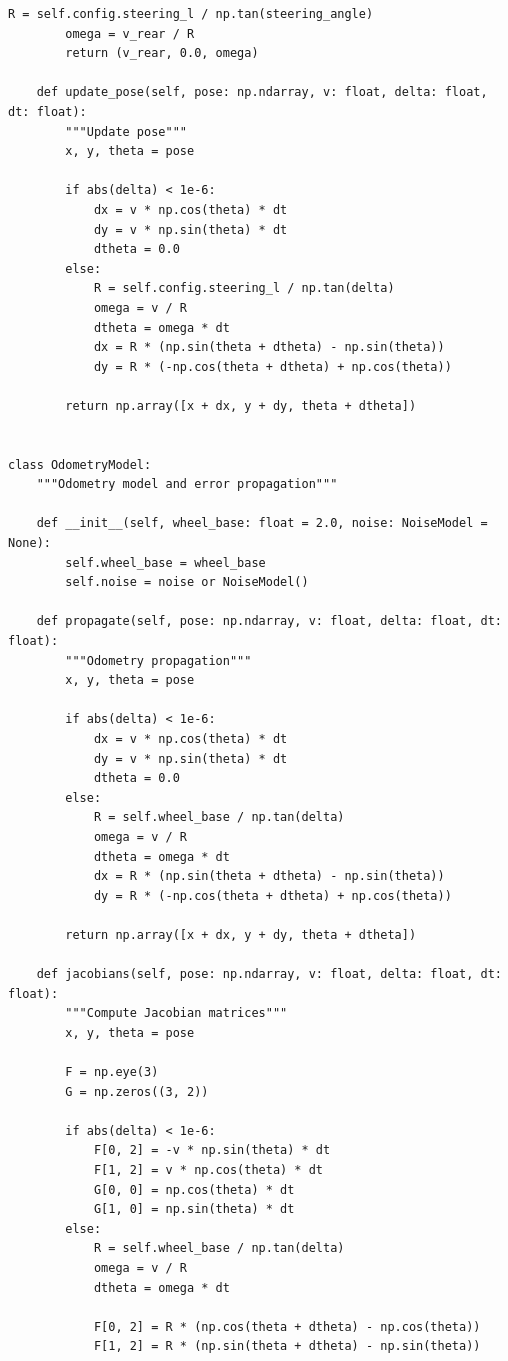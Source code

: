 \documentclass[12pt,a4paper]{report}
\begin{document}
\begin{lstlisting}[caption={Complete Simulation System (complete\_simulation.py)}]
        R = self.config.steering_l / np.tan(steering_angle)
        omega = v_rear / R
        return (v_rear, 0.0, omega)
    
    def update_pose(self, pose: np.ndarray, v: float, delta: float, dt: float):
        """Update pose"""
        x, y, theta = pose
        
        if abs(delta) < 1e-6:
            dx = v * np.cos(theta) * dt
            dy = v * np.sin(theta) * dt
            dtheta = 0.0
        else:
            R = self.config.steering_l / np.tan(delta)
            omega = v / R
            dtheta = omega * dt
            dx = R * (np.sin(theta + dtheta) - np.sin(theta))
            dy = R * (-np.cos(theta + dtheta) + np.cos(theta))
        
        return np.array([x + dx, y + dy, theta + dtheta])


class OdometryModel:
    """Odometry model and error propagation"""
    
    def __init__(self, wheel_base: float = 2.0, noise: NoiseModel = None):
        self.wheel_base = wheel_base
        self.noise = noise or NoiseModel()
        
    def propagate(self, pose: np.ndarray, v: float, delta: float, dt: float):
        """Odometry propagation"""
        x, y, theta = pose
        
        if abs(delta) < 1e-6:
            dx = v * np.cos(theta) * dt
            dy = v * np.sin(theta) * dt
            dtheta = 0.0
        else:
            R = self.wheel_base / np.tan(delta)
            omega = v / R
            dtheta = omega * dt
            dx = R * (np.sin(theta + dtheta) - np.sin(theta))
            dy = R * (-np.cos(theta + dtheta) + np.cos(theta))
        
        return np.array([x + dx, y + dy, theta + dtheta])
    
    def jacobians(self, pose: np.ndarray, v: float, delta: float, dt: float):
        """Compute Jacobian matrices"""
        x, y, theta = pose
        
        F = np.eye(3)
        G = np.zeros((3, 2))
        
        if abs(delta) < 1e-6:
            F[0, 2] = -v * np.sin(theta) * dt
            F[1, 2] = v * np.cos(theta) * dt
            G[0, 0] = np.cos(theta) * dt
            G[1, 0] = np.sin(theta) * dt
        else:
            R = self.wheel_base / np.tan(delta)
            omega = v / R
            dtheta = omega * dt
            
            F[0, 2] = R * (np.cos(theta + dtheta) - np.cos(theta))
            F[1, 2] = R * (np.sin(theta + dtheta) - np.sin(theta))
            

\end{lstlisting}
\end{document}
